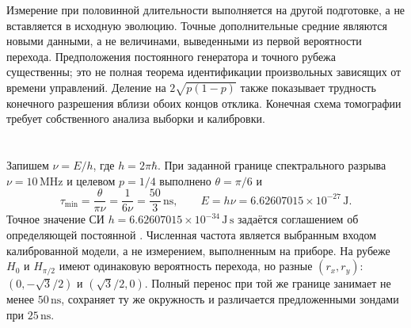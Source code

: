 {Измерение при половинной длительности выполняется на другой подготовке, а не вставляется в исходную эволюцию. Точные дополнительные средние являются новыми данными, а не величинами, выведенными из первой вероятности перехода. Предположения постоянного генератора и точного рубежа существенны; это не полная теорема идентификации произвольных зависящих от времени управлений. Деление на $2\sqrt{p(1-p)}$ также показывает трудность конечного разрешения вблизи обоих концов отклика. Конечная схема томографии требует собственного анализа выборки и калибровки.}

\section{}\label{sec:benchmark}
{Запишем $\nu=E/h$, где $h=2\pi\hbar$. При заданной границе спектрального разрыва $\nu=10\,\mathrm{MHz}$ и целевом $p=1/4$ выполнено $\theta=\pi/6$ и}
\begin{equation}\label{eq:units}
 \tau_{\min}=\frac{\theta}{\pi\nu}=\frac1{6\nu}
 =\frac{50}{3}\,\mathrm{ns},\qquad E=h\nu=6.62607015\times10^{-27}\,\mathrm J.
\end{equation}
{Точное значение СИ $h=6.62607015\times10^{-34}\,\mathrm{J\,s}$ задаётся соглашением об определяющей постоянной \cite{BIPM}. Численная частота является выбранным входом калиброванной модели, а не измерением, выполненным на приборе. На рубеже $H_0$ и $H_{\pi/2}$ имеют одинаковую вероятность перехода, но разные $(r_x,r_y)$: $(0,-\sqrt3/2)$ и $(\sqrt3/2,0)$. Полный перенос при той же границе занимает не менее $50\,\mathrm{ns}$, сохраняет ту же окружность и различается предложенными зондами при $25\,\mathrm{ns}$.}

